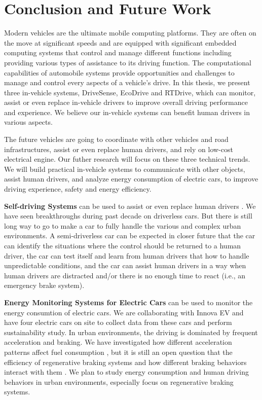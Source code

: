 \chapter{Conclusion and Future Work}
\label{chapter_conclusion}

Modern vehicles are the ultimate mobile computing platforms. 
They are often on the move at significant speeds and 
are equipped with significant embedded computing systems 
that control and manage different functions including providing various types of 
assistance to its driving function. 
The computational capabilities of automobile systems provide opportunities and challenges 
to manage and control every aspects of a vehicle's drive. 
In this thesis, we present three in-vehicle systems, DriveSense, EcoDrive and RTDrive,
which can monitor, assist or even replace in-vehicle drivers 
to improve overall driving performance and experience.
We believe our in-vehicle systems can benefit human drivers
in various aspects.

The future vehicles are going to coordinate
with other vehicles and road infrastructures, 
assist or even replace human drivers, 
and rely on low-cost electrical engine. 
Our futher research will focus on these three 
technical trends. 
We will build practical in-vehicle systems to
communicate with other objects, assist
human drivers, and analyze energy consumption of
electric cars, to improve driving experience,
safety and energy efficiency. 


\textbf{Self-driving Systems} can be used to 
assist or even replace human drivers \cite{googledriverlesscar}. 
We have seen breakthroughs during past decade on driverless
cars. 
But there is still long way to go to make a car to fully handle
the various and complex urban environments.  
A semi-driverless car can be expected in closer
future that the car can identify the situations 
where the control should be returned to a human driver, 
the car can test itself and learn from human drivers
that how to handle unpredictable conditions, 
and the car can assist human drivers in a way when
human drivers are distracted and/or there is no enough
time to react (i.e., an emergency brake system).  


\textbf{Energy Monitoring Systems for Electric Cars} 
can be used to monitor the energy consumtion of electric
cars.
We are collaborating with Innova EV and have four electric
cars on site \cite{electriccaruw} to collect data
from these cars and perform sustainability study. 
In urban environments, the driving is dominated 
by frequent acceleration and braking. 
We have investigated how different acceleration
patterns affect fuel consumption \cite{kang2015ecodrive},
but it is still an open question that the efficiency of
regenerative braking systems and how different braking
behaviors interact with them \cite{ahn2009analysis}. 
We plan to study energy consumption and human driving
behaviors in urban environments, especially
focus on regenerative braking systems. 


